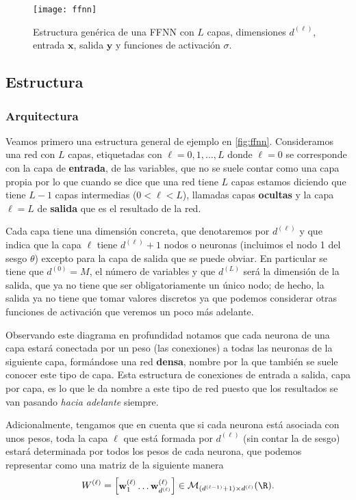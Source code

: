 \begin{figure}[htpb]
  \centering
  \texttt{[image: ffnn]}
  \caption{Estructura genérica de una FFNN con $L$ capas, dimensiones $d^{(\ell)}$, entrada $\textbf{x}$, salida $\textbf{y}$ y funciones de activación $\sigma$.}
  \label{fig:ffnn}
\end{figure}

\subsection{Estructura}

\subsubsection{Arquitectura}

Veamos primero una estructura general de ejemplo en \autoref{fig:ffnn}. Consideramos una red con $L$ capas, etiquetadas con $\ell = 0, 1, \ldots, L$ donde $\ell = 0$ se corresponde con la capa de \textbf{entrada}, de las variables, que no se suele contar como una capa propia por lo que cuando se dice que una red tiene $L$ capas estamos diciendo que tiene $L-1$ capas intermedias ($0 < \ell < L$), llamadas capas \textbf{ocultas} y la capa $\ell = L$ de \textbf{salida} que es el resultado de la red.

Cada capa tiene una dimensión concreta, que denotaremos por $d^{(\ell)}$ y que indica que la capa $\ell$ tiene $d^{(\ell)} + 1$ nodos o neuronas (incluimos el nodo 1 del sesgo $\theta$) excepto para la capa de salida que se puede obviar. En particular se tiene que $d^{(0)} = M$, el número de variables y que $d^{(L)}$ será la dimensión de la salida, que ya no tiene que ser obligatoriamente un único nodo; de hecho, la salida ya no tiene que tomar valores discretos ya que podemos considerar otras funciones de activación que veremos un poco más adelante.

Observando este diagrama en profundidad notamos que cada neurona de una capa estará conectada por un peso (las conexiones) a todas las neuronas de la siguiente capa, formándose una red \textbf{densa}, nombre por la que también se suele conocer este tipo de capa. Esta estructura de conexiones de entrada a salida, capa por capa, es lo que le da nombre a este tipo de red puesto que los resultados se van pasando \emph{hacia adelante} siempre.

Adicionalmente, tengamos que en cuenta que si cada neurona está asociada con unos pesos, toda la capa $\ell$ que está formada por $d^{(\ell)}$ (sin contar la de sesgo) estará determinada por todos los pesos de cada neurona, que podemos representar como una matriz de la siguiente manera
\begin{equation*}
  W^{(\ell)} = \begin{bmatrix} \textbf{w}^{(\ell)}_{1} \ldots \textbf{w}^{(\ell)}_{d^{(\ell)}} \end{bmatrix} \in \mathcal{M}_{(d^{(\ell - 1)} + 1) \times d^{(\ell)}}(\R).
  \label{eq:pesos}
\end{equation*}

